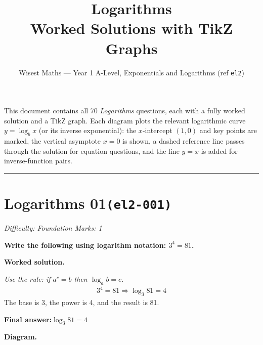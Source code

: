 \documentclass[11pt]{article}
\title{\textbf{Logarithms}\\[0.3em]\large Worked Solutions with TikZ Graphs}
\author{Wisest Maths --- Year 1 A-Level, Exponentials and Logarithms (ref \texttt{el2})}
\date{}
\newcommand{\question}[1]{\par\medskip\noindent\textbf{#1}\par}
\begin{document}
\maketitle
\noindent This document contains all 70 \emph{Logarithms} questions, each with a fully worked
solution and a TikZ graph. Each diagram plots the relevant logarithmic curve \(y=\log_b x\) (or its inverse
exponential): the \(x\)-intercept \((1,0)\) and key points are marked, the vertical asymptote \(x=0\) is shown,
a dashed reference line passes through the solution for equation questions, and the line \(y=x\) is added for
inverse-function pairs.
\tableofcontents
\bigskip
\hrule

\section*{Logarithms 01\quad\small\texttt{(el2-001)}}
\textit{Difficulty: Foundation \quad\textbar\quad Marks: 1}

\question{Write the following using logarithm notation: \( 3^4 = 81 \).}

\textbf{Worked solution.}

\textit{Use the rule: if \( a^c = b \) then \( \log_a b = c \).}
\[\begin{gathered}
3^4 = 81 \Rightarrow \log_3 81 = 4
\end{gathered}\]
The base is 3, the power is 4, and the result is 81.

\begin{answerbox}
\textbf{Final answer:}\quad \(\displaystyle  \log_3 81 = 4 \)
\end{answerbox}
\textbf{Diagram.}
\end{document}
